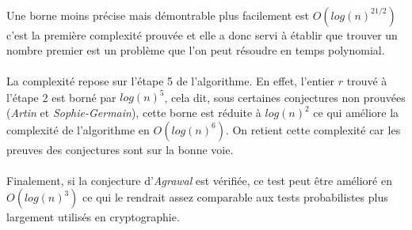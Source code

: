 		\paragraph{}Une borne moins précise mais démontrable plus facilement est $O(log(n)^{21/2})$ c'est la première complexité prouvée et elle a donc servi à établir que trouver un nombre premier est un problème que l'on peut résoudre en temps polynomial.
		\paragraph{}La complexité repose sur l'étape 5 de l'algorithme. En effet, l'entier $r$ trouvé à l'étape 2 est borné par $log(n)^{5}$, cela dit, sous certaines conjectures non prouvées (\textit{Artin} et \textit{Sophie-Germain}), cette borne est réduite à $log(n)^2$ ce qui améliore la complexité de l'algorithme en $O(log(n)^6)$. On retient cette complexité car les preuves des conjectures sont sur la bonne voie.
		\paragraph{}Finalement, si la conjecture d'\textit{Agrawal} est vérifiée, ce test peut être amélioré en $O(log(n)^{3})$ ce qui le rendrait assez comparable aux tests probabilistes plus largement utilisés en cryptographie.
